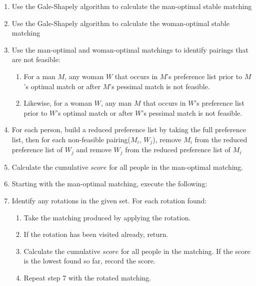 \documentclass[a4paper]{article}
\begin{document}
\begin{enumerate}
    \item Use the Gale-Shapely algorithm to calculate the man-optimal stable matching
    
    \item Use the Gale-Shapely algorithm to calculate the woman-optimal stable matching
    
    \item Use the man-optimal and woman-optimal matchings to identify pairings that are not feasible:
    \begin{enumerate}
        \item For a man $M$, any woman $W$ that occurs in $M$'s preference list prior to $M$'s optimal match or after $M$'s pessimal match is not feasible.
        \item Likewise, for a woman $W$, any man $M$ that occurs in $W$'s preference list prior to $W$'s optimal match or after $W$'s pessimal match is not feasible.
    \end{enumerate}

    \item For each person, build a reduced preference list by taking the full preference list, then for each non-feasible pairing($M_i$, $W_j$), remove $M_i$ from the reduced preference list of $W_j$ and remove $W_j$ from the reduced preference list of $M_i$

    \item Calculate the cumulative $score$ for all people in the man-optimal matching.

    \item Starting with the man-optimal matching, execute the following:

    \item Identify any rotations in the given set. For each rotation found:
    \begin{enumerate}
        \item Take the matching produced by applying the rotation.
        \item If the rotation has been visited already, return.
        \item Calculate the cumulative $score$ for all people in the matching. If the score is the lowest found so far, record the score.
        \item Repeat step 7 with the rotated matching.
    \end{enumerate}
\end{enumerate}
\end{document}
